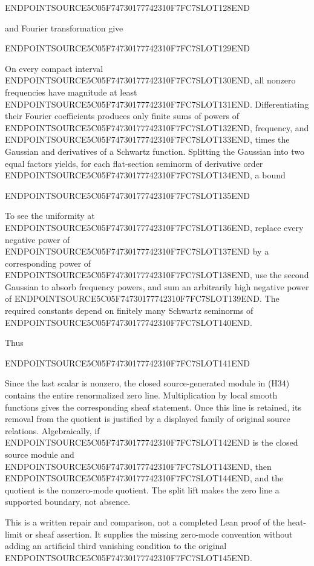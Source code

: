 ENDPOINTSOURCE5C05F74730177742310F7FC7SLOT128END

and Fourier transformation give

ENDPOINTSOURCE5C05F74730177742310F7FC7SLOT129END

On every compact interval ENDPOINTSOURCE5C05F74730177742310F7FC7SLOT130END, all nonzero frequencies have magnitude at least ENDPOINTSOURCE5C05F74730177742310F7FC7SLOT131END. Differentiating their Fourier coefficients produces only finite sums of powers of ENDPOINTSOURCE5C05F74730177742310F7FC7SLOT132END, frequency, and ENDPOINTSOURCE5C05F74730177742310F7FC7SLOT133END, times the Gaussian and derivatives of a Schwartz function. Splitting the Gaussian into two equal factors yields, for each flat-section seminorm of derivative order ENDPOINTSOURCE5C05F74730177742310F7FC7SLOT134END, a bound

ENDPOINTSOURCE5C05F74730177742310F7FC7SLOT135END

To see the uniformity at ENDPOINTSOURCE5C05F74730177742310F7FC7SLOT136END, replace every negative power of ENDPOINTSOURCE5C05F74730177742310F7FC7SLOT137END by a corresponding power of ENDPOINTSOURCE5C05F74730177742310F7FC7SLOT138END, use the second Gaussian to absorb frequency powers, and sum an arbitrarily high negative power of ENDPOINTSOURCE5C05F74730177742310F7FC7SLOT139END. The required constants depend on finitely many Schwartz seminorms of ENDPOINTSOURCE5C05F74730177742310F7FC7SLOT140END.

Thus

ENDPOINTSOURCE5C05F74730177742310F7FC7SLOT141END

Since the last scalar is nonzero, the closed source-generated module in (H34) contains the entire renormalized zero line. Multiplication by local smooth functions gives the corresponding sheaf statement. Once this line is retained, its removal from the quotient is justified by a displayed family of original source relations. Algebraically, if ENDPOINTSOURCE5C05F74730177742310F7FC7SLOT142END is the closed source module and ENDPOINTSOURCE5C05F74730177742310F7FC7SLOT143END, then ENDPOINTSOURCE5C05F74730177742310F7FC7SLOT144END, and the quotient is the nonzero-mode quotient. The split lift makes the zero line a supported boundary, not absence.

This is a written repair and comparison, not a completed Lean proof of the heat-limit or sheaf assertion. It supplies the missing zero-mode convention without adding an artificial third vanishing condition to the original ENDPOINTSOURCE5C05F74730177742310F7FC7SLOT145END.

